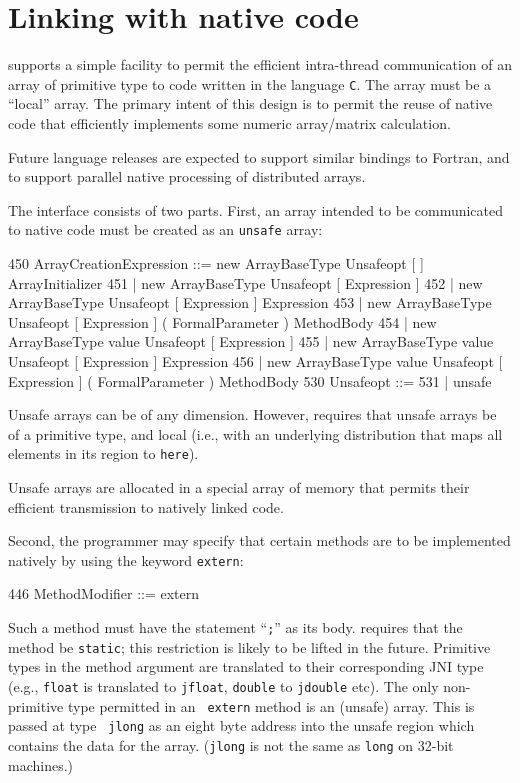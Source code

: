 \chapter{Linking with native code}\label{extern}
\XtenCurrVer{} supports a simple facility to permit the efficient
intra-thread communication of an array of primitive type to code
written in the language {\tt C}.  The array must be a ``local''
array. The primary intent of this design is to permit the reuse of
native code that efficiently implements some numeric array/matrix
calculation.

Future language releases are expected to support similar bindings to
{\sc Fortran}, and to support parallel native processing of
distributed \Xten{} arrays. 

The interface consists of two parts. First, an array intended to be
communicated to native code must be created as an {\tt unsafe} array:
\begin{x10}
450 ArrayCreationExpression ::= 
      new ArrayBaseType Unsafeopt [ ] 
        ArrayInitializer
451   | new ArrayBaseType Unsafeopt [ Expression ]
452   | new ArrayBaseType Unsafeopt 
          [ Expression ] Expression
453   | new ArrayBaseType Unsafeopt [ Expression ] 
          ( FormalParameter ) MethodBody
454   | new ArrayBaseType value 
           Unsafeopt [ Expression ]
455   | new ArrayBaseType value 
           Unsafeopt [ Expression ] Expression
456   | new ArrayBaseType value 
        Unsafeopt [ Expression ] 
          ( FormalParameter ) MethodBody
530   Unsafeopt ::=
531     | unsafe
\end{x10}
Unsafe arrays can be of any dimension. However, \XtenCurrVer{}
requires that unsafe arrays be of a primitive type, and local
(i.e.,
with an underlying distribution that maps all elements in its region
to {\tt here}).

Unsafe arrays are allocated in a special array of memory that permits
their efficient transmission to natively linked code.

Second, the \Xten{} programmer may specify that certain methods are to
be implemented natively by using the keyword {\tt extern}:
\begin{x10}
446   MethodModifier ::= extern
\end{x10}
Such a method must have the statement ``{\tt ;}'' as its body.
\XtenCurrVer{} requires that the method be {\tt static}; this
restriction is likely to be lifted in the future.  Primitive types in
the method argument are translated to their corresponding JNI type
(e.g., {\tt float} is translated to {\tt jfloat}, {\tt double} to
{\tt jdouble} etc).  The only non-primitive type permitted in an {\tt
extern} method is an (unsafe) array. This is passed at type {\tt
jlong} as an eight byte address into the unsafe region which contains
the data for the array. ({\tt jlong} is not the same as {\tt long} on
32-bit machines.)


